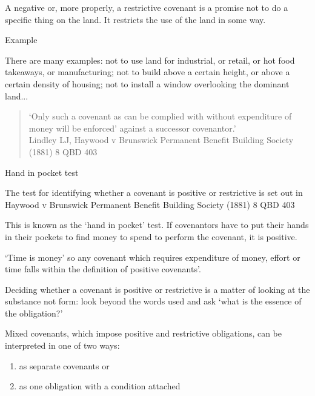 \documentclass[
]{article}
\providecommand{\tightlist}{%
  \setlength{\itemsep}{0pt}\setlength{\parskip}{0pt}}
\newenvironment{env-9a1d7316-f242-42ab-b216-19df5e12c935}
{
    \savenotes\tcolorbox[blanker,breakable,left=5pt,borderline west={2pt}{-4pt}{pink}]
}
{
    \endtcolorbox\spewnotes
}
\newenvironment{env-de3101d4-f08b-48eb-bc0e-2fa06f3bcf8e}
{
    \savenotes\tcolorbox[blanker,breakable,left=5pt,borderline west={2pt}{-4pt}{purple}]
}
{
    \endtcolorbox\spewnotes
}
\begin{document}
A negative or, more properly, a restrictive covenant is a promise not to
do a specific thing on the land. It restricts the use of the land in
some way.

\begin{env-de3101d4-f08b-48eb-bc0e-2fa06f3bcf8e}

Example

There are many examples: not to use land for industrial, or retail, or
hot food takeaways, or manufacturing; not to build above a certain
height, or above a certain density of housing; not to install a window
overlooking the dominant land...

\end{env-de3101d4-f08b-48eb-bc0e-2fa06f3bcf8e}

\begin{quote}
`Only such a covenant as can be complied with without expenditure of
money will be enforced' against a successor covenantor.'\\
Lindley LJ, Haywood v Brunswick Permanent Benefit Building Society
(1881) 8 QBD 403
\end{quote}

\begin{env-9a1d7316-f242-42ab-b216-19df5e12c935}

Hand in pocket test

The test for identifying whether a covenant is positive or restrictive
is set out in Haywood v Brunswick Permanent Benefit Building Society
(1881) 8 QBD 403

This is known as the `hand in pocket' test. If covenantors have to put
their hands in their pockets to find money to spend to perform the
covenant, it is positive.

`Time is money' so any covenant which requires expenditure of money,
effort or time falls within the definition of positive covenants'.

\end{env-9a1d7316-f242-42ab-b216-19df5e12c935}

Deciding whether a covenant is positive or restrictive is a matter of
looking at the substance not form: look beyond the words used and ask
`what is the essence of the obligation?'

Mixed covenants, which impose positive and restrictive obligations, can
be interpreted in one of two ways:

\begin{enumerate}
\tightlist
\item
  as separate covenants or
\item
  as one obligation with a condition attached
\end{enumerate}
\end{document}
